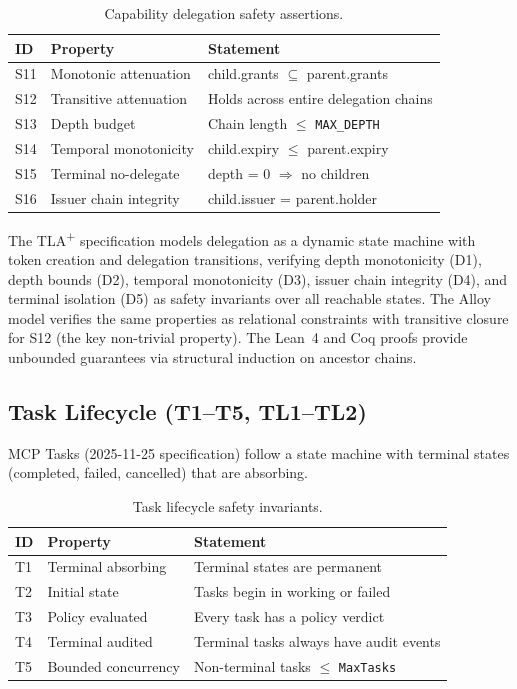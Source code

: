 \documentclass[sigplan,screen,nonacm]{acmart}
\newcommand{\tlaplus}{TLA\textsuperscript{+}\xspace}
\begin{document}
\begin{table}[h]
\caption{Capability delegation safety assertions.}
\label{tab:cap-safety}
\small
\begin{tabular}{@{}llp{5.2cm}@{}}
\toprule
ID & Property & Statement \\
\midrule
S11 & Monotonic attenuation & child.grants $\subseteq$ parent.grants \\
S12 & Transitive attenuation & Holds across entire delegation chains \\
S13 & Depth budget & Chain length $\leq$ \texttt{MAX\_DEPTH} \\
S14 & Temporal monotonicity & child.expiry $\leq$ parent.expiry \\
S15 & Terminal no-delegate & depth = 0 $\Rightarrow$ no children \\
S16 & Issuer chain integrity & child.issuer = parent.holder \\
\bottomrule
\end{tabular}
\end{table}

The \tlaplus specification models delegation as a dynamic state machine with
token creation and delegation transitions, verifying depth monotonicity (D1),
depth bounds (D2), temporal monotonicity (D3), issuer chain integrity (D4),
and terminal isolation (D5) as safety invariants over all reachable states.
The Alloy model verifies the same properties as relational constraints with
transitive closure for S12 (the key non-trivial property). The Lean~4 and
Coq proofs provide unbounded guarantees via structural induction on ancestor
chains.


\subsection{Task Lifecycle (T1--T5, TL1--TL2)}
\label{sec:task}

MCP Tasks (2025-11-25 specification) follow a state machine with terminal
states (completed, failed, cancelled) that are absorbing.

\begin{table}[h]
\caption{Task lifecycle safety invariants.}
\label{tab:task-safety}
\small
\begin{tabular}{@{}llp{5.2cm}@{}}
\toprule
ID & Property & Statement \\
\midrule
T1 & Terminal absorbing & Terminal states are permanent \\
T2 & Initial state & Tasks begin in working or failed \\
T3 & Policy evaluated & Every task has a policy verdict \\
T4 & Terminal audited & Terminal tasks always have audit events \\
T5 & Bounded concurrency & Non-terminal tasks $\leq$ \texttt{MaxTasks} \\
\bottomrule
\end{tabular}
\end{table}
\end{document}

